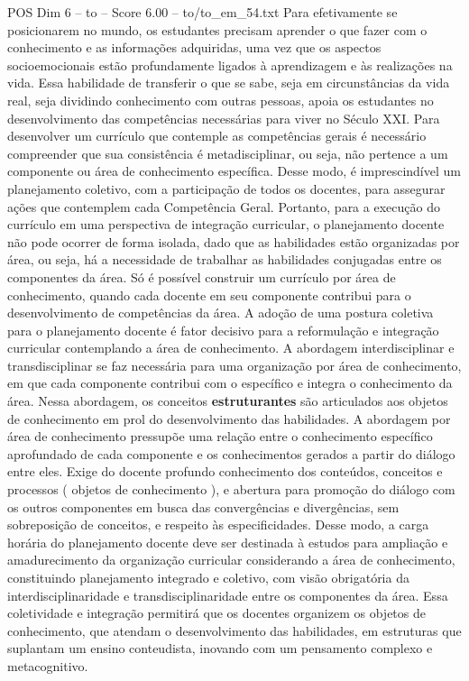 \begin{textsample}{POS Dim 6 – to – Score 6.00 – to/to\_em\_54.txt}
Para efetivamente se posicionarem no mundo, os estudantes precisam aprender o que fazer com o conhecimento e as informações adquiridas, uma vez que os aspectos socioemocionais estão profundamente ligados à aprendizagem e às realizações na vida.
Essa habilidade de transferir o que se sabe, seja em circunstâncias da vida real, seja dividindo conhecimento com outras pessoas, apoia os estudantes no desenvolvimento das competências necessárias para viver no Século XXI.
Para desenvolver um currículo que contemple as competências gerais é necessário compreender que sua consistência é metadisciplinar, ou seja, não pertence a um componente ou área de conhecimento específica.
Desse modo, é imprescindível um planejamento coletivo, com a participação de todos os docentes, para assegurar ações que contemplem cada Competência Geral.
Portanto, para a execução do currículo em uma perspectiva de integração curricular, o planejamento docente não pode ocorrer de forma isolada, dado que as habilidades estão organizadas por área, ou seja, há a necessidade de trabalhar as habilidades conjugadas entre os componentes da área.
Só é possível construir um currículo por área de conhecimento, quando cada docente em seu componente contribui para o desenvolvimento de competências da área.
A adoção de uma postura coletiva para o planejamento docente é fator decisivo para a reformulação e integração curricular contemplando a área de conhecimento.
A abordagem interdisciplinar e transdisciplinar se faz necessária para uma organização por área de conhecimento, em que cada componente contribui com o específico e integra o conhecimento da área.
Nessa abordagem, os conceitos \textbf{estruturantes} são articulados aos objetos de conhecimento em prol do desenvolvimento das habilidades.
A abordagem por área de conhecimento pressupõe uma relação entre o conhecimento específico aprofundado de cada componente e os conhecimentos gerados a partir do diálogo entre eles.
Exige do docente profundo conhecimento dos conteúdos, conceitos e processos ( objetos de conhecimento ), e abertura para promoção do diálogo com os outros componentes em busca das convergências e divergências, sem sobreposição de conceitos, e respeito às especificidades.
Desse modo, a carga horária do planejamento docente deve ser destinada à estudos para ampliação e amadurecimento da organização curricular considerando a área de conhecimento, constituindo planejamento integrado e coletivo, com visão obrigatória da interdisciplinaridade e transdisciplinaridade entre os componentes da área.
Essa coletividade e integração permitirá que os docentes organizem os objetos de conhecimento, que atendam o desenvolvimento das habilidades, em estruturas que suplantam um ensino conteudista, inovando com um pensamento complexo e metacognitivo.

\end{textsample}
